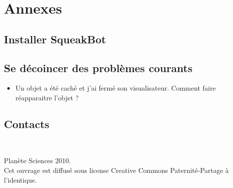 \documentclass[a4paper,12pt]{book}
\def\appName{SqueakBot}
\begin{document}
\chapter{Annexes}

\section{Installer \appName}

\section{Se décoincer des problèmes courants}

\begin{itemize}
	\item Un objet a été caché et j'ai fermé son visualisateur. Comment faire réapparaitre l'objet ?
\end{itemize}

\section{Contacts}

\printglossaries

\clearpage
~
\vfill
\begin{center}
	Planète Sciences 2010.\\
	Cet ouvrage est diffusé sous license Creative Commons Paternité-Partage à l'identique.\\
\end{center}

\vfill
\end{document}
